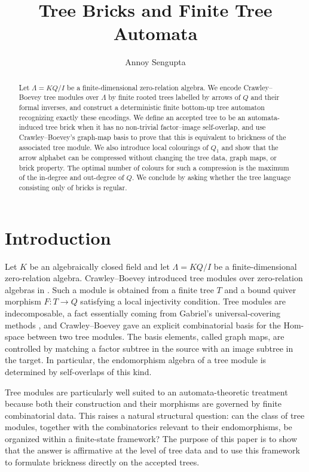 \documentclass[11pt,a4paper]{amsart}
\title{Tree Bricks and Finite Tree Automata}
\author{Annoy Sengupta}
\date{}
\theoremstyle{definition}
\theoremstyle{plain}
\theoremstyle{remark}
\numberwithin{equation}{section}
\begin{document}
\begin{abstract}
Let $\Lambda=KQ/I$ be a finite-dimensional zero-relation algebra. We encode Crawley--Boevey tree modules over $\Lambda$ by finite rooted trees labelled by arrows of $Q$ and their formal inverses, and construct a deterministic finite bottom-up tree automaton recognizing exactly these encodings. We define an accepted tree to be an automata-induced tree brick when it has no non-trivial factor--image self-overlap, and use Crawley--Boevey's graph-map basis to prove that this is equivalent to brickness of the associated tree module. We also introduce local colourings of $Q_1$ and show that the arrow alphabet can be compressed without changing the tree data, graph maps, or brick property. The optimal number of colours for such a compression is the maximum of the in-degree and out-degree of $Q$. We conclude by asking whether the tree language consisting only of bricks is regular.
\end{abstract}

\maketitle

\section{Introduction}
\label{sec:introduction}

Let $K$ be an algebraically closed field and let $\Lambda=KQ/I$ be a finite-dimensional zero-relation algebra. Crawley--Boevey introduced tree modules over zero-relation algebras in \cite{CB89}. Such a module is obtained from a finite tree $T$ and a bound quiver morphism $F:T\to Q$ satisfying a local injectivity condition. Tree modules are indecomposable, a fact essentially coming from Gabriel's universal-covering methods \cite{Gab81}, and Crawley--Boevey \cite{CB89} gave an explicit combinatorial basis for the Hom-space between two tree modules. The basis elements, called graph maps, are controlled by matching a factor subtree in the source with an image subtree in the target. In particular, the endomorphism algebra of a tree module is determined by self-overlaps of this kind.

Tree modules are particularly well suited to an automata-theoretic treatment because both their construction and their morphisms are governed by finite combinatorial data. This raises a natural structural question: can the class of tree modules, together with the combinatorics relevant to their endomorphisms, be organized within a finite-state framework? The purpose of this paper is to show that the answer is affirmative at the level of tree data and to use this framework to formulate brickness directly on the accepted trees.
\end{document}
